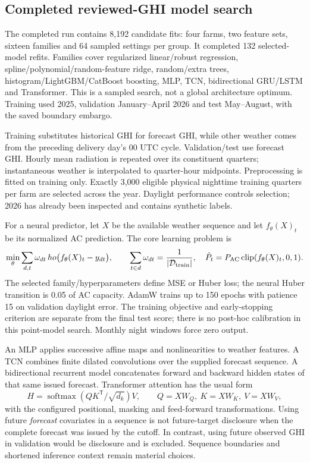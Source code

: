 \subsection{Completed reviewed-GHI model search}
The completed run  contains 8,192
candidate fits: four farms, two feature sets, sixteen families and 64 sampled
settings per group. It completed 132 selected-model refits. Families cover
regularized linear/robust regression, spline/polynomial/random-feature ridge,
random/extra trees, histogram/LightGBM/CatBoost boosting, MLP, TCN,
bidirectional GRU/LSTM and Transformer. This is a sampled search, not a global
architecture optimum. Training used 2025, validation January--April 2026 and
test May--August, with the saved boundary embargo.

Training substitutes historical GHI for forecast GHI, while other weather
comes from the preceding delivery day's 00 UTC cycle. Validation/test use
forecast GHI. Hourly mean radiation is repeated over its constituent quarters;
instantaneous weather is interpolated to quarter-hour midpoints. Preprocessing
is fitted on training only. Exactly 3,000 eligible physical nighttime training
quarters per farm are selected across the year. Daylight performance controls
selection; 2026 has already been inspected and contains synthetic labels.

For a neural predictor, let $X$ be the available weather sequence and let
$f_\theta(X)_t$ be its normalized AC prediction. The core learning problem is
\begin{equation}\label{eq:pv-training}
 \min_\theta \sum_{d,t}\omega_{dt}\,
ho\bigl(f_\theta(X)_t-y_{dt}\bigr),
 \qquad \sum_{t\in d}\omega_{dt}=\frac1{|\mathcal D_{\rm train}|},
 \quad \hat P_t=P_{\rm AC}\operatorname{clip}(f_\theta(X)_t,0,1).
\end{equation}
The selected family/hyperparameters define MSE or Huber loss; the neural Huber
transition is 0.05 of AC capacity. AdamW trains up to 150 epochs with patience
15 on validation daylight error. The training objective and early-stopping
criterion are separate from the final test score; there is no post-hoc
calibration in this point-model search. Monthly night windows force zero output.

An MLP applies successive affine maps and nonlinearities to weather features.
A TCN combines finite dilated convolutions over the supplied forecast sequence.
A bidirectional recurrent model concatenates forward and backward hidden states
of that same issued forecast. Transformer attention has the usual form
\begin{equation}
 H=\operatorname{softmax}(QK^{\mathsf T}/\sqrt{d_k})V,
 \qquad Q=XW_Q,\ K=XW_K,\ V=XW_V,
\end{equation}
with the configured positional, masking and feed-forward transformations.
Using future \emph{forecast} covariates in a sequence is not future-target
disclosure when the complete forecast was issued by the cutoff. In contrast,
using future observed GHI in validation would be disclosure and is excluded.
Sequence boundaries and shortened inference context remain material choices.

